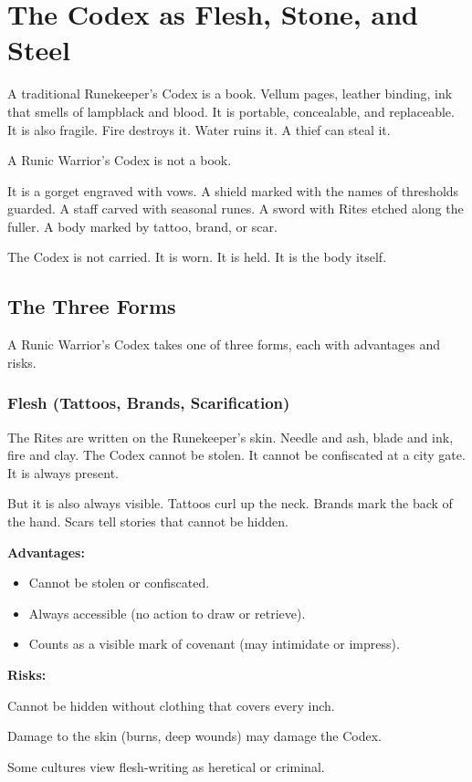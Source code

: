 \section{The Codex as Flesh, Stone, and Steel}

A traditional Runekeeper's Codex is a book. Vellum pages, leather binding, ink that smells of lampblack and blood. It is portable, concealable, and replaceable. It is also fragile. Fire destroys it. Water ruins it. A thief can steal it.

A Runic Warrior's Codex is not a book.

It is a gorget engraved with vows. A shield marked with the names of thresholds guarded. A staff carved with seasonal runes. A sword with Rites etched along the fuller. A body marked by tattoo, brand, or scar.

The Codex is not carried. It is worn. It is held. It is the body itself.

\subsection{The Three Forms}

A Runic Warrior's Codex takes one of three forms, each with advantages and risks.

\subsubsection{Flesh (Tattoos, Brands, Scarification)}

The Rites are written on the Runekeeper's skin. Needle and ash, blade and ink, fire and clay. The Codex cannot be stolen. It cannot be confiscated at a city gate. It is always present.

But it is also always visible. Tattoos curl up the neck. Brands mark the back of the hand. Scars tell stories that cannot be hidden.

\textbf{Advantages:}
\begin{itemize}
\item Cannot be stolen or confiscated.
\item Always accessible (no action to draw or retrieve).
\item Counts as a visible mark of covenant (may intimidate or impress).
\end{itemize}

\textbf{Risks:}
\item Cannot be hidden without clothing that covers every inch.
\item Damage to the skin (burns, deep wounds) may damage the Codex.
\item Some cultures view flesh-writing as heretical or criminal.

